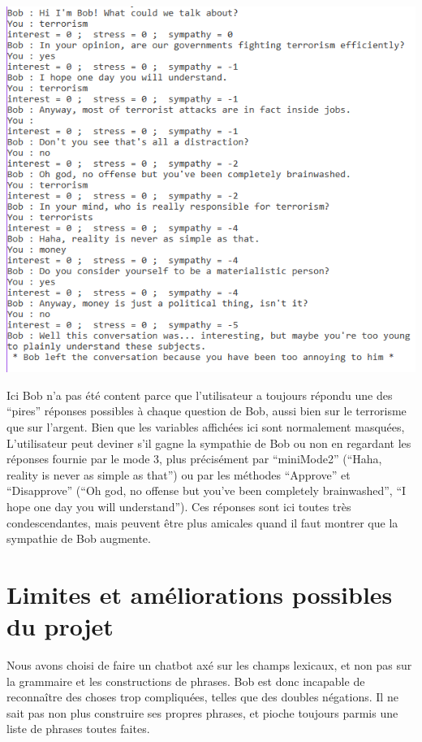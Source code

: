 \documentclass[paper=a4, 12pt]{report}
\begin{document}
\includegraphics[scale=0.5]{screen5.png}

\vspace{0.5cm}

Ici Bob n’a pas été content parce que l’utilisateur a toujours répondu une des “pires” réponses possibles à chaque question de Bob, aussi bien sur le terrorisme que sur l’argent. Bien que les variables affichées ici sont normalement masquées, L’utilisateur peut deviner s’il gagne la sympathie de Bob ou non en regardant les réponses fournie par le mode 3, plus précisément par “miniMode2” (“Haha, reality is never as simple as that”) ou par les méthodes “Approve” et
“Disapprove” (“Oh god, no offense but you’ve been completely brainwashed”, “I hope one day you will understand”). Ces réponses sont ici toutes très condescendantes, mais peuvent être plus amicales quand il faut montrer que la sympathie de Bob augmente.

\section{Limites et améliorations possibles du projet}
\vspace{0.5cm}
Nous avons choisi de faire un chatbot axé sur les champs lexicaux, et non pas sur la grammaire et les constructions de phrases. Bob est donc incapable de reconnaître des choses trop compliquées, telles que des doubles négations. Il ne sait pas non plus construire ses propres phrases, et pioche toujours parmis une liste de phrases toutes faites.
\end{document}
